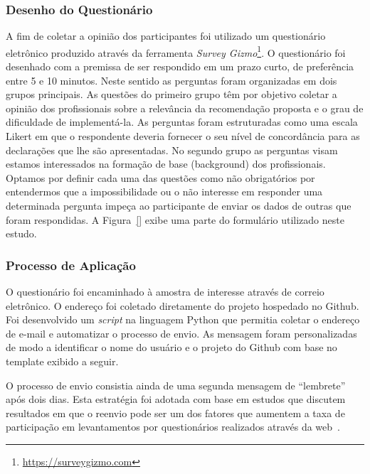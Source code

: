 \subsubsection{Desenho do Questionário}
\label{ssub:sug_melhoria_desenho_questionario}

A fim de coletar a opinião dos participantes foi utilizado um questionário
eletrônico produzido através da ferramenta \textit{Survey
	Gizmo}\footnote{\url{https://surveygizmo.com}}. O questionário foi desenhado
com a premissa de ser respondido em um prazo curto, de preferência entre 5 e 10
minutos. Neste sentido as perguntas foram organizadas em dois grupos principais.
As questões do primeiro grupo têm por objetivo coletar a opinião dos
profissionais sobre a relevância da recomendação proposta e o grau de
dificuldade de implementá-la. As perguntas foram estruturadas como uma escala
Likert em que o respondente deveria fornecer o seu nível de concordância para as
declarações que lhe são apresentadas. No segundo grupo as perguntas visam
estamos interessados na formação de base (background) dos profissionais. Optamos
por definir cada uma das questões como não obrigatórios por entendermos que a
impossibilidade ou o não interesse em responder uma determinada pergunta impeça
ao participante de enviar os dados de outras que foram respondidas. A
Figura~\ref{} exibe uma parte do formulário utilizado neste estudo.


\subsubsection{Processo de Aplicação}
\label{ssub:processo_de_aplicação}

O questionário foi encaminhado à amostra de interesse através de correio
eletrônico. O endereço foi coletado diretamente do projeto hospedado no Github.
Foi desenvolvido um \textit{script} na linguagem Python que permitia coletar o
endereço de e-mail e automatizar o processo de envio. As mensagem foram
personalizadas de modo a identificar o nome do usuário e o projeto do Github
com base no template exibido a seguir.


O processo de envio consistia ainda de uma segunda mensagem de ``lembrete'' após
dois dias. Esta estratégia foi adotada com base em estudos que discutem
resultados em que o reenvio pode ser um dos fatores que aumentem a taxa de
participação em levantamentos por questionários realizados através da
web~\cite{fan2010factors}.

